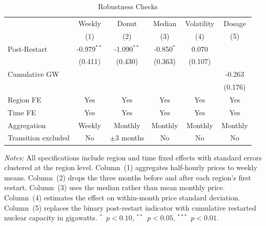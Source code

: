 \begin{table}[t]
\centering
\caption{Robustness Checks}
\label{tab:robust}
\begin{tabular}{lccccc}
\hline\hline
 & Weekly & Donut & Median & Volatility & Dosage \\
 & (1) & (2) & (3) & (4) & (5) \\
\hline
Post-Restart & -0.979$^{**}$ & -1.090$^{**}$ & -0.850$^{*}$ & 0.070 & \\
 & (0.411) & (0.430) & (0.363) & (0.107) & \\
Cumulative GW & & & & & -0.263 \\
 & & & & & (0.176) \\
\hline
Region FE & Yes & Yes & Yes & Yes & Yes \\
Time FE & Yes & Yes & Yes & Yes & Yes \\
Aggregation & Weekly & Monthly & Monthly & Monthly & Monthly \\
Transition excluded & No & $\pm$3 months & No & No & No \\
\hline\hline
\end{tabular}
\begin{tablenotes}
\item \textit{Notes:} All specifications include region and time fixed effects with standard errors clustered at the region level. Column~(1) aggregates half-hourly prices to weekly means. Column~(2) drops the three months before and after each region's first restart. Column~(3) uses the median rather than mean monthly price. Column~(4) estimates the effect on within-month price standard deviation. Column~(5) replaces the binary post-restart indicator with cumulative restarted nuclear capacity in gigawatts. $^{*}$~$p<0.10$, $^{**}$~$p<0.05$, $^{***}$~$p<0.01$.
\end{tablenotes}
\end{table}

